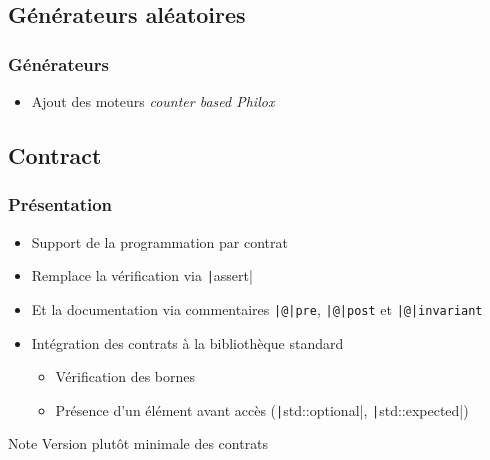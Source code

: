 \documentclass[C++.tex]{subfiles}
\begin{document}
\subsection*{Générateurs aléatoires}
\begin{frame}[fragile]
	\frametitle{Générateurs}
	\begin{itemize}
		\item Ajout des moteurs \textit{counter based Philox}
	\end{itemize}

\end{frame}

\subsection*{Contract}
\begin{frame}[fragile]
	\frametitle{Présentation}
	\begin{itemize}
		\item Support de la programmation par contrat
		\item Remplace la vérification via \texttt|assert|
		\item Et la documentation via commentaires \texttt{|@|pre}, \texttt{|@|post} et \texttt{|@|invariant}
		\item Intégration des contrats à la bibliothèque standard
		\begin{itemize}
			\item Vérification des bornes
			\item Présence d'un élément avant accès (\texttt|std::optional|, \texttt|std::expected|)
		\end{itemize}
	\end{itemize}

	\begin{block}{Note}
		Version plutôt minimale des contrats
	\end{block}

\end{frame}
\end{document}
